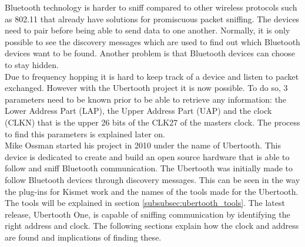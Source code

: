 \label{subsubsec:ubertooth}
Bluetooth technology is harder to sniff compared to other wireless protocols such as 802.11 that already have solutions for promiscuous packet sniffing. The devices need to pair before being able to send data to one another. Normally, it is only possible to see the discovery messages which are used to find out which Bluetooth devices want to be found. Another problem is that Bluetooth devices can choose to stay hidden. \\
Due to frequency hopping it is hard to keep track of a device and listen to packet exchanged. However with the Ubertooth project \cite{Ubertooth} it is now possible. To do so, 3 parameters need to be known prior to be able to retrieve any information: the Lower Address Part (LAP), the Upper Address Part (UAP) and the clock (CLKN) that is the upper 26 bits of the CLK27 of the masters clock. The process to find this parameters is explained later on.
\\
Mike Ossman started his project \cite{Ubertooth} in 2010 under the name of Ubertooth. This device is dedicated to create and build an open source hardware that is able to follow and sniff Bluetooth communication. The Ubertooth was initially made to follow  Bluetooth devices through discovery messages. This can be seen in the way the plug-ins for Kismet work and the names of the tools made for the Ubertooth. The tools will be explained in section \ref{subsubsec:ubertooth_tools}. The latest release, Ubertooth One, is capable of sniffing communication by identifying the right address and clock. The following sections explain how the clock and address are found and implications of finding these.


